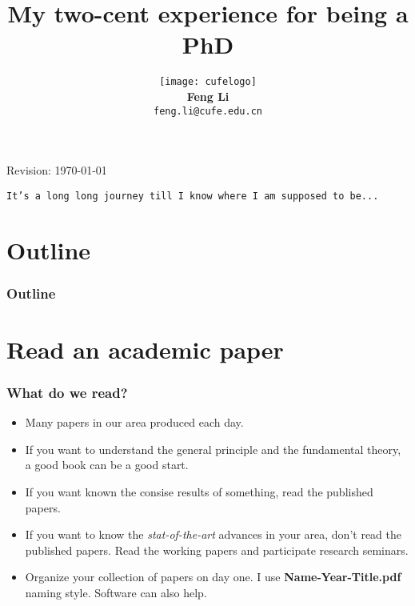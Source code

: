 \documentclass[10pt]{beamer}
\title[Academic English in Statistics]{{\textbf{My two-cent experience for
      being a PhD}}}
\author[Feng Li]{\texttt{[image: cufelogo]}\\
\vspace{0.5cm}\textbf{Feng Li}\\\texttt{feng.li@cufe.edu.cn}}
\institute[StatMath, CUFE]{\footnotesize{\textbf{School of Statistics and
      Mathematics\\ Central University of Finance and Economics}}}
\date{}
\begin{document}
\begin{frame}[plain]
  \titlepage
  \tiny{Revision: \today}
\end{frame}

\begin{frame}[plain]
  \begin{center}
    \texttt{It's a long long journey till I know where I am supposed to be...}
  \end{center}
\end{frame}

\section*{Outline}
\begin{frame}
  \frametitle{Outline}
  \addtocounter{framenumber}{-1}
  \tableofcontents
\end{frame}


\section{Read an academic paper}
\begin{frame}
  \frametitle{What do we read?}

  \begin{itemize}
  \item Many papers in our area produced each day.
  \item If you want to understand the general principle and the fundamental
    theory, a good book can be a good start.
  \item If you want known the consise results of something, read the published papers.
  \item If you want to know the \emph{stat-of-the-art} advances in your area,
    don't read the published papers. Read the working papers and participate
    research seminars.

  \item Organize your collection of papers on day one. I use
    \textbf{Name-Year-Title.pdf} naming style. Software can also help.
  \end{itemize}

\end{frame}
\end{document}
